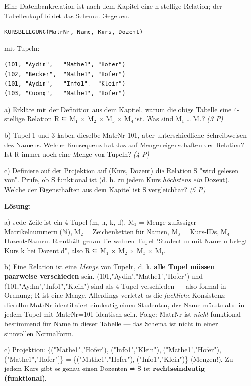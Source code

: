 \documentclass[11pt, a4paper]{article}
\begin{document}
Eine Datenbankrelation ist nach dem Kapitel eine n-stellige Relation; der Tabellenkopf bildet das Schema. Gegeben:


\begin{lstlisting}
KURSBELEGUNG(MatrNr, Name, Kurs, Dozent)
\end{lstlisting}


mit Tupeln:

\begin{lstlisting}
(101, "Aydin",   "Mathe1", "Hofer")
(102, "Becker",  "Mathe1", "Hofer")
(101, "Aydın",   "Info1",  "Klein")
(103, "Cuong",   "Mathe1", "Hofer")
\end{lstlisting}


a) Erkläre mit der Definition aus dem Kapitel, warum die obige Tabelle eine 4-stellige Relation R ⊆ M₁ × M₂ × M₃ × M₄ ist. Was sind M₁ … M₄? \textit{(3 P)}

b) Tupel 1 und 3 haben dieselbe MatrNr 101, aber unterschiedliche Schreibweisen des Namens. Welche Konsequenz hat das auf Mengeneigenschaften der Relation? Ist R immer noch eine Menge von Tupeln? \textit{(4 P)}

c) Definiere auf der Projektion auf (Kurs, Dozent) die Relation S "wird gelesen von". Prüfe, ob S funktional ist (d. h. zu jedem Kurs \textit{höchstens ein} Dozent). Welche der Eigenschaften aus dem Kapitel ist S vergleichbar? \textit{(5 P)}


\textbf{Lösung:}


a) Jede Zeile ist ein 4-Tupel (m, n, k, d). M₁ = Menge zulässiger Matrikelnummern (ℕ), M₂ = Zeichenketten für Namen, M₃ = Kurs-IDs, M₄ = Dozent-Namen. R enthält genau die wahren Tupel "Student m mit Name n belegt Kurs k bei Dozent d", also R ⊆ M₁ × M₂ × M₃ × M₄.


b) Eine Relation ist eine \textit{Menge} von Tupeln, d. h. \textbf{alle Tupel müssen paarweise verschieden} sein. (101,"Aydin","Mathe1","Hofer") und (101,"Aydın","Info1","Klein") sind als 4-Tupel verschieden — also formal in Ordnung; R ist eine Menge. Allerdings verletzt es die \textit{fachliche} Konsistenz: dieselbe MatrNr identifiziert eindeutig einen Studenten, der Name müsste also in jedem Tupel mit MatrNr=101 identisch sein. Folge: MatrNr ist \textit{nicht} funktional bestimmend für Name in dieser Tabelle — das Schema ist nicht in einer sinnvollen Normalform.


c) Projektion: \{("Mathe1","Hofer"), ("Info1","Klein"), ("Mathe1","Hofer"), ("Mathe1","Hofer")\} = \{("Mathe1","Hofer"), ("Info1","Klein")\} (Mengen!). Zu jedem Kurs gibt es genau einen Dozenten ⇒ S ist \textbf{rechtseindeutig (funktional)}.
\end{document}
